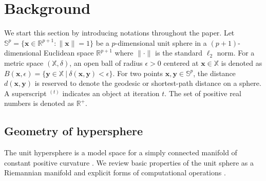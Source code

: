 \documentclass[10pt]{article}
\newcommand{\bfx}{\mathbf{x}}
\newcommand{\bfy}{\mathbf{y}}
\newcommand{\bbS}{\mathbb{S}}
\newcommand{\bbR}{\mathbb{R}}
\newcommand{\bbX}{\mathbb{X}}
\newcommand{\bbRpos}{\mathbb{R}^+}
\begin{document}
\section{Background}\label{sec2:background}

We start this section by introducing notations throughout the paper. Let $\bbS^p = \lbrace \bfx \in \bbR^{p+1}: \|\bfx\| = 1 \rbrace$ be a $p$-dimensional unit sphere in a $(p+1)$-dimensional Euclidean space $\bbR^{p+1}$ where $\| \cdot \|$ is the standard $\ell_2$ norm. For a metric space $(\bbX, \delta)$, an open ball of radius $\epsilon > 0$ centered at $\bfx \in \bbX$ is denoted as $B(\bfx, \epsilon) = \lbrace \bfy \in \bbX~|~ \delta(\bfx, \bfy) < \epsilon \rbrace$. For two points $\bfx, \bfy \in \bbS^p$, the distance $d(\bfx, \bfy)$ is reserved to denote the geodesic or shortest-path distance on a sphere. A superscript $^{(t)}$ indicates an object at iteration $t$. The set of positive real numbers is denoted as $\bbRpos$. 

\subsection{Geometry of hypersphere}

The unit hypersphere is a model space for a simply connected manifold of constant positive curvature \cite{carmo_1992_RiemannianGeometry, lee_1997_RiemannianManifoldsIntroduction}. We review basic properties of the unit sphere as a Riemannian manifold and explicit forms of computational operations \cite{absil_2008_OptimizationAlgorithmsMatrix}.
\end{document}
